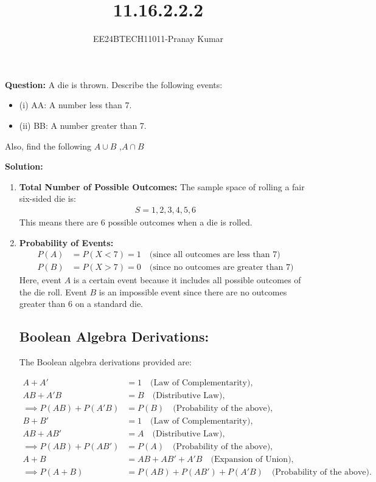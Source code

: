 \documentclass[journal]{IEEEtran}
\begin{document}

\title{11.16.2.2.2}
\author{EE24BTECH11011-Pranay Kumar}
\maketitle
\textbf{Question:} A die is thrown. Describe the following events:
\begin{itemize}
\item (i) AA: A number less than 7.
\item (ii) BB: A number greater than 7.
\end{itemize}
Also, find the following $A\cup B$ ,$A \cap B$

\textbf{Solution:}
\begin{enumerate}
\item \textbf{Total Number of Possible Outcomes:}
The sample space of rolling a fair six-sided die is:
\begin{align}
S = {1, 2, 3, 4, 5, 6}
\end{align}
This means there are 6 possible outcomes when a die is rolled.
\item \textbf{Probability of Events:}
\begin{align}
    P(A) &= P(X < 7) = 1 \quad \text{(since all outcomes are less than 7)} \\
    P(B) &= P(X > 7) = 0 \quad \text{(since no outcomes are greater than 7)}
\end{align}
Here, event \( A \) is a certain event because it includes all possible outcomes of the die roll. Event \( B \) is an impossible event since there are no outcomes greater than 6 on a standard die.
\subsection*{Boolean Algebra Derivations:}
The Boolean algebra derivations provided are:

\begin{align}
A + A' &= 1 \quad \text{(Law of Complementarity)}, \\
AB + A'B &= B \quad \text{(Distributive Law)}, \\
\implies P(AB) + P(A'B) &= P(B) \quad \text{(Probability of the above)}, \\
B + B' &= 1 \quad \text{(Law of Complementarity)}, \\
AB + AB' &= A \quad \text{(Distributive Law)}, \\
\implies P(AB) + P(AB') &= P(A) \quad \text{(Probability of the above)}, \\
A + B &= AB + AB' + A'B \quad \text{(Expansion of Union)}, \\
\implies P(A + B) &= P(AB) + P(AB') + P(A'B) \quad \text{(Probability of the above)}.
\end{align}



\end{enumerate}
\end{document}
